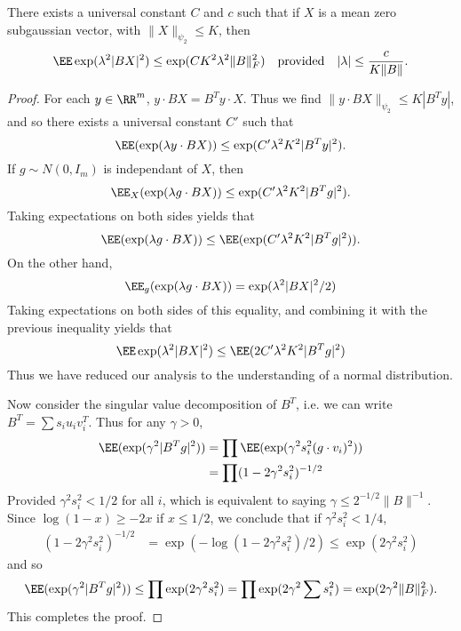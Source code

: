 \begin{lemma}
	There exists a universal constant $C$ and $c$ such that if $X$ is a mean zero subgaussian vector, with $\| X \|_{\psi_2} \leq K$, then
	\[ \EE \exp(\lambda^2 |BX|^2) \leq \exp(C K^2 \lambda^2 \| B \|_F^2)\quad\text{provided}\quad |\lambda| \leq \frac{c}{K \| B \|}. \]
\end{lemma}
\begin{proof}
	For each $y \in \RR^m$, $y \cdot BX = B^Ty \cdot X$. Thus we find $\| y \cdot BX \|_{\psi_2} \leq K |B^Ty|$, and so there exists a universal constant $C'$ such that
	\[ \EE(\exp(\lambda y \cdot BX)) \leq \exp(C' \lambda^2 K^2 |B^T y|^2). \]
	If $g \sim N(0,I_m)$ is independant of $X$, then
	\[ \EE_X(\exp(\lambda g \cdot BX)) \leq \exp(C' \lambda^2 K^2 |B^Tg|^2). \]
	Taking expectations on both sides yields that
	\[ \EE(\exp(\lambda g \cdot BX)) \leq \EE(\exp(C' \lambda^2 K^2 |B^T g|^2)). \]
	On the other hand,
	\[ \EE_g(\exp(\lambda g \cdot BX)) = \exp(\lambda^2 |BX|^2/2) \]
	Taking expectations on both sides of this equality, and combining it with the previous inequality yields that
	\[ \EE \exp(\lambda^2 |BX|^2) \leq \EE(2C' \lambda^2 K^2 |B^T g|^2) \]
	Thus we have reduced our analysis to the understanding of a normal distribution.

	Now consider the singular value decomposition of $B^T$, i.e. we can write $B^T = \sum s_i u_i v_i^T$. Thus for any $\gamma > 0$,
	\begin{align*}
		\EE(\exp(\gamma^2 |B^T g|^2)) &= \prod \EE(\exp(\gamma^2 s_i^2 (g \cdot v_i)^2))\\
		&= \prod (1 - 2 \gamma^2 s_i^2)^{-1/2}
	\end{align*}
	Provided $\gamma^2 s_i^2 < 1/2$ for all $i$, which is equivalent to saying $\gamma \leq 2^{-1/2} \| B \|^{-1}$. Since $\log(1-x) \geq -2x$ if $x \leq 1/2$, we conclude that if $\gamma^2 s_i^2 < 1/4$,
	\begin{align*}
		(1 - 2 \gamma^2 s_i^2)^{-1/2} &= \exp(- \log(1 - 2\gamma^2s_i^2)/2) \leq \exp(2 \gamma^2 s_i^2)
	\end{align*}
	and so
	\[ \EE(\exp(\gamma^2 |B^T g|^2)) \leq \prod \exp(2 \gamma^2 s_i^2) = \prod \exp(2 \gamma^2 \sum s_i^2) = \exp(2 \gamma^2 \| B \|_F^2). \]
	This completes the proof.
\end{proof}


